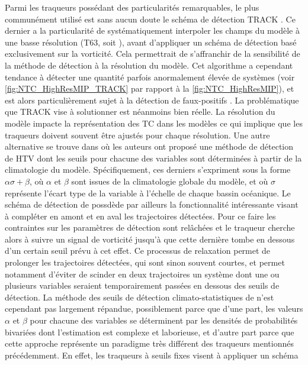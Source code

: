 \documentclass[../main.tex]{subfiles}
\begin{document}
Parmi les traqueurs possédant des particularités remarquables, le plus communément utilisé est sans aucun doute le schéma de détection TRACK
\parencite{hodges_how_2017}. Ce dernier a la particularité de systématiquement interpoler les champs du modèle à une basse résolution (T63, soit ),
avant d'appliquer un schéma de détection basé exclusivement sur la vorticité. Cela permettrait de s'affranchir de la sensibilité de la méthode de détection à la
résolution du modèle. Cet algorithme a cependant tendance à détecter une quantité parfois anormalement élevée de systèmes (voir \cref{fig:NTC_HighResMIP_TRACK}
par rapport à la \cref{fig:NTC_HighResMIP}), et est alors particulièrement sujet à la détection de faux-positifs \parencite{bourdin_intercomparison_2022}. La
problématique que TRACK vise à solutionner est néanmoins bien réelle. La résolution du modèle impacte la représentation des TC dans les modèles ce qui implique
que les traqueurs doivent souvent être ajustés pour chaque résolution. Une autre alternative se trouve dans \cite{camargo_improving_2002} où les auteurs ont
proposé une méthode de détection de HTV dont les seuils pour chacune des variables sont déterminées à partir de la climatologie du modèle. Spécifiquement, ces
derniers s'expriment sous la forme $\alpha \sigma + \beta$, où $\alpha$ et $\beta$ sont issues de la climatologie globale du modèle, et où $\sigma$ représente
l'écart type de la variable à l'échelle de chaque bassin océanique. Le schéma de détection de \cite{camargo_improving_2002} possdède par ailleurs la
fonctionnalité intéressante visant à compléter en amont et en aval les trajectoires détectées. Pour ce faire les contraintes sur les paramètres de détection
sont relâchées et le traqueur cherche alors à suivre un signal de vorticité jusqu'à que cette dernière tombe en dessous d'un certain seuil prévu à cet effet. Ce
processus de relaxation permet de prolonger les trajectoires détectées, qui sont sinon souvent courtes, et permet notamment d'éviter de scinder en deux
trajectoires un système dont une ou plusieurs variables seraient temporairement passées en dessous des seuils de détection. La méthode des seuils de détection
climato-statistiques de \cite{camargo_improving_2002} n'est cependant pas largement répandue, possiblement parce que d'une part, les valeurs $\alpha$ et $\beta$
pour chacune des variables se déterminent par les densités de probabilités bivariées dont l'estimation est complexe et laborieuse, et d'autre part parce que
cette approche représente un paradigme très différent des traqueurs mentionnés précédemment. En effet, les traqueurs à seuils fixes visent à appliquer un schéma
\end{document}
